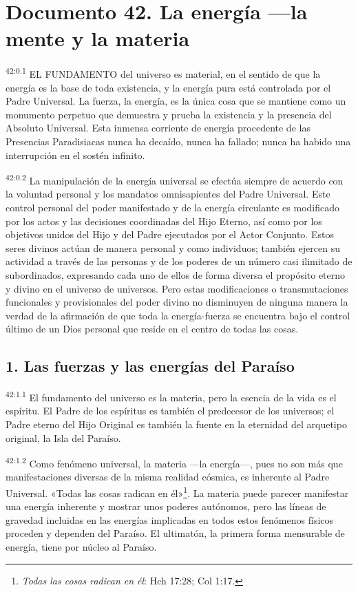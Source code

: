 \chapter{Documento 42. La energía ---la mente y la materia}
\par
\textsuperscript{42:0.1} EL FUNDAMENTO del universo es material, en el sentido de que la energía es la base de toda existencia, y la energía pura está controlada por el Padre Universal. La fuerza, la energía, es la única cosa que se mantiene como un monumento perpetuo que demuestra y prueba la existencia y la presencia del Absoluto Universal. Esta inmensa corriente de energía procedente de las Presencias Paradisiacas nunca ha decaído, nunca ha fallado; nunca ha habido una interrupción en el sostén infinito.

\par
\textsuperscript{42:0.2} La manipulación de la energía universal se efectúa siempre de acuerdo con la voluntad personal y los mandatos omnisapientes del Padre Universal. Este control personal del poder manifestado y de la energía circulante es modificado por los actos y las decisiones coordinadas del Hijo Eterno, así como por los objetivos unidos del Hijo y del Padre ejecutados por el Actor Conjunto. Estos seres divinos actúan de manera personal y como individuos; también ejercen su actividad a través de las personas y de los poderes de un número casi ilimitado de subordinados, expresando cada uno de ellos de forma diversa el propósito eterno y divino en el universo de universos. Pero estas modificaciones o transmutaciones funcionales y provisionales del poder divino no disminuyen de ninguna manera la verdad de la afirmación de que toda la energía-fuerza se encuentra bajo el control último de un Dios personal que reside en el centro de todas las cosas.

\section*{1. Las fuerzas y las energías del Paraíso}
\par
\textsuperscript{42:1.1} El fundamento del universo es la materia, pero la esencia de la vida es el espíritu. El Padre de los espíritus es también el predecesor de los universos; el Padre eterno del Hijo Original es también la fuente en la eternidad del arquetipo original, la Isla del Paraíso.

\par
\textsuperscript{42:1.2} Como fenómeno universal, la materia ---la energía---, pues no son más que manifestaciones diversas de la misma realidad cósmica, es inherente al Padre Universal. «Todas las cosas radican en él»\footnote{\textit{Todas las cosas radican en él}: Hch 17:28; Col 1:17.}. La materia puede parecer manifestar una energía inherente y mostrar unos poderes autónomos, pero las líneas de gravedad incluidas en las energías implicadas en todos estos fenómenos físicos proceden y dependen del Paraíso. El ultimatón, la primera forma mensurable de energía, tiene por núcleo al Paraíso.

